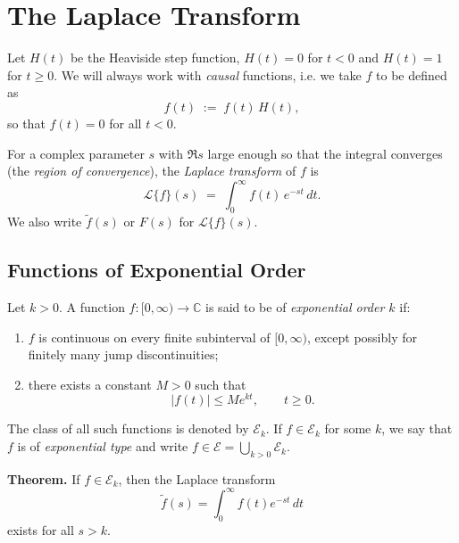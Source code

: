 \documentclass[12pt]{article}
\begin{document}
\section*{The Laplace Transform}

Let $H(t)$ be the Heaviside step function, $H(t)=0$ for $t<0$ and $H(t)=1$ for $t\ge0$.  
We will always work with \emph{causal} functions, i.e. we take $f$ to be defined as
\[
f(t)\;:=\;f(t)\,H(t),
\]
so that $f(t)=0$ for all $t<0$.

\medskip
\noindent For a complex parameter $s$ with $\Re s$ large enough so that the integral converges (the \emph{region of convergence}),
the \emph{Laplace transform} of $f$ is
\[
\mathcal{L}\{f\}(s)\;=\;\int_{0}^{\infty} f(t)\,e^{-st}\,dt.
\]
We also write $\tilde f(s)$ or $F(s)$ for $\mathcal{L}\{f\}(s)$.

\subsection*{Functions of Exponential Order}

\noindent
Let $k>0$. A function $f:[0,\infty)\to\mathbb{C}$ is said to be of \emph{exponential order $k$} if:

\begin{enumerate}[label=(\roman*)]
  \item $f$ is continuous on every finite subinterval of $[0,\infty)$, except possibly for finitely many jump discontinuities;
  \item there exists a constant $M>0$ such that
  \[
    |f(t)| \le M e^{k t}, \qquad t \ge 0.
  \]
\end{enumerate}

\noindent
The class of all such functions is denoted by $\mathcal{E}_k$.  
If $f \in \mathcal{E}_k$ for some $k$, we say that $f$ is of \emph{exponential type} and write $f \in \mathcal{E} = \bigcup_{k>0} \mathcal{E}_k$.

\medskip
\noindent
\textbf{Theorem.}  
If $f \in \mathcal{E}_k$, then the Laplace transform
\[
\tilde{f}(s) = \int_{0}^{\infty} f(t)e^{-st}\,dt
\]
exists for all $s > k$.
\end{document}
